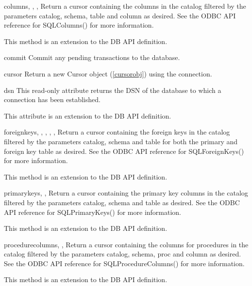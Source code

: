 \documentclass{manual}
\begin{document}
\begin{funcdesc}{columns}{, ,
    , }
  Return a cursor containing the columns in the catalog filtered by the
  parameters catalog, schema, table and column as desired. See the ODBC API
  reference for SQLColumns() for more information.

   This method is an extension to the DB API definition.
\end{funcdesc}

\begin{funcdesc}{commit}{}
  Commit any pending transactions to the database.
\end{funcdesc}

\begin{funcdesc}{cursor}{}
  Return a new Cursor object (\ref{cursorobj}) using the connection.
\end{funcdesc}

\begin{datadesc}{dsn}
  This read-only attribute returns the DSN of the database to which a
  connection has been established.

   This attribute is an extension to the DB API definition.
\end{datadesc}

\begin{funcdesc}{foreignkeys}{, ,
    , , ,
    }
  Return a cursor containing the foreign keys in the catalog filtered by the
  parameters catalog, schema and table for both the primary and foreign key
  table as desired. See the ODBC API reference for SQLForeignKeys() for more
  information.

   This method is an extension to the DB API definition.
\end{funcdesc}

\begin{funcdesc}{primarykeys}{, ,
    }
  Return a cursor containing the primary key columns in the catalog filtered by
  the parameters catalog, schema and table as desired. See the ODBC API
  reference for SQLPrimaryKeys() for more information.

   This method is an extension to the DB API definition.
\end{funcdesc}

\begin{funcdesc}{procedurecolumns}{, ,
     }
  Return a cursor containing the columns for procedures in the catalog filtered
  by the parameters catalog, schema, proc and column as desired. See the ODBC
  API reference for SQLProcedureColumns() for more information.

   This method is an extension to the DB API definition.
\end{funcdesc}
\end{document}

